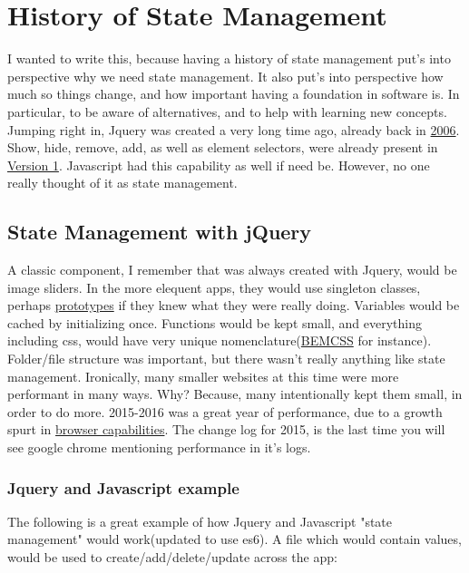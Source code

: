 
\section{ History of State Management }

I wanted to write this, because having a history of state management put's into
perspective why we need state management. It also put's into perspective how
much so things change, and how important having a foundation in software is.
In particular, to be aware of alternatives, and to help with learning new
concepts. Jumping right in, Jquery was created a very long time ago, already
back in \href{https://en.wikipedia.org/wiki/JQuery}{2006}. Show, hide, remove,
add, as well as element selectors, were already present in
\href{http://api.jquery.com/category/version/1.0/}{Version 1}. Javascript had
this capability as well if need be. However, no one really thought of it as
state management.

\subsection{ State Management with jQuery }
A classic component, I remember that was always created with Jquery, would be
image sliders. In the more elequent apps, they would use singleton classes,
perhaps \href{https://www.w3schools.com/js/js\_object\_prototypes.asp}{prototypes}
if they knew what they were really doing. Variables would be cached by
initializing once. Functions would be kept small, and everything including css,
would have very unique nomenclature(\href{http://getbem.com/introduction/}{BEMCSS}
for instance). Folder/file structure was important, but there wasn't really
anything like state management. Ironically, many smaller websites at this time
were more performant in many ways. Why? Because, many intentionally kept them
small, in order to do more. 2015-2016 was a great year of performance, due to a
growth spurt in \href{https://chromereleases.googleblog.com/2015/03/stable-channel-update.html}{browser capabilities}.
The change log for 2015, is the last time you will see google chrome mentioning
performance in it's logs.

\subsubsection{Jquery and Javascript example}
The following is a great example of how Jquery and Javascript 
"state management" would work(updated to use es6). A file which would
contain values, would be used to create/add/delete/update across the app:

